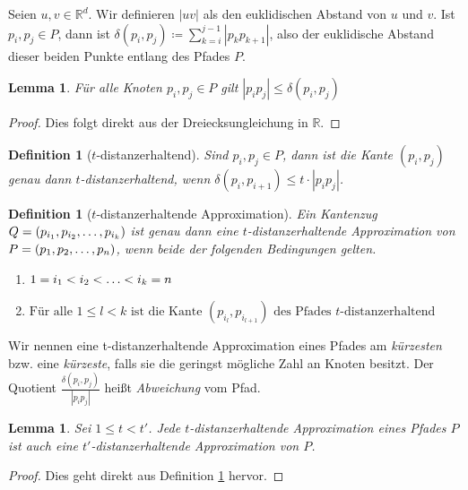 \documentclass[11pt]{article}
\newcommand{\R}{\mathbb{R}}
\newtheorem{lemma}[theorem]{Lemma}
\newtheorem{definition}[theorem]{Definition}
\begin{document}
    Seien $u, v \in \R^d$. Wir definieren $|uv|$ als den euklidischen Abstand von $u$ und $v$.
    Ist $p_i, p_j \in P$, dann ist $\delta(p_i, p_j) \coloneqq \sum\limits_{k=i}^{j-1}{|p_k
    p_{k+1}|}$, also der euklidische Abstand dieser beiden Punkte entlang des Pfades $P$.
	\begin{lemma}
		\label{lem:triangle}
		Für alle Knoten $p_i, p_j \in P$ gilt $|p_ip_j| \leq \delta(p_i, p_j)$
	\end{lemma}
	\begin{proof}
		Dies folgt direkt aus der Dreiecksungleichung in $\R$.
	\end{proof}
	
	\begin{definition}[$t$-distanzerhaltend]
		\label{def:t-dist}
		Sind $p_i, p_j \in P$, dann ist die Kante $(p_i, p_j)$ genau dann \emph{$t$-distanzerhaltend}, wenn $\delta(p_i, p_{i+1}) \leq t \cdot |p_ip_j|$.
	\end{definition}

	\begin{definition}[$t$-distanzerhaltende Approximation]
		\label{def:t-distapp}
		Ein Kantenzug $Q = (p_{i_1}, p_{i_2}, \mathellipsis, p_{i_k})$ ist genau dann eine \emph{$t$-distanzerhaltende Approximation von $P = (p_1, p_2, \mathellipsis, p_n)$}, wenn beide der folgenden Bedingungen gelten.
		\begin{enumerate}
			\item $\displaystyle 1 = i_1 < i_2 < \mathellipsis < i_k = n$
			\item $\displaystyle \text{Für alle } 1 \leq l < k \text{ ist die Kante } (p_{i_l}, p_{i_{l+1}}) \text{ des Pfades $t$-distanzerhaltend}$
		\end{enumerate}
	\end{definition}
	
	Wir nennen eine t-distanzerhaltende Approximation eines Pfades am \emph{kürzesten} bzw. eine \emph{kürzeste}, falls sie die geringst mögliche Zahl an Knoten besitzt.
	Der Quotient $\frac{\delta(p_i, p_j)}{|p_ip_j|}$ heißt \emph{Abweichung} vom Pfad.
	\begin{lemma}
		\label{lem:approximations}
		Sei $1 \leq t < t'$. Jede $t$-distanzerhaltende Approximation eines Pfades $P$ ist auch eine $t'$-distanzerhaltende Approximation von $P$.
	\end{lemma}
	\begin{proof}
		Dies geht direkt aus Definition \ref{def:t-distapp} hervor.
	\end{proof}
	
\end{document}
